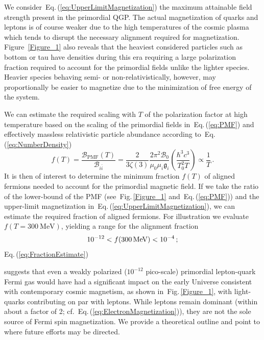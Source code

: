 \documentclass[epjST]{svjour}
\newcommand*{\MeV}{\text{\,MeV}}
\newcommand{\req}[1]{Eq.\,(\ref{#1})}
\newcommand{\rf}[1]{Fig.\,{\ref{#1}}}
\begin{document}
{\color{blue}We consider~\req{eq:UpperLimitMagnetization} the maximum attainable field strength present in the primordial QGP. The actual magnetization of quarks and leptons is of course weaker due to the high temperatures of the cosmic plasma which tends to disrupt the necessary alignment required for magnetization. Figure~\ref{Figure_1} also reveals that the heaviest considered particles such as bottom or tau have densities during this era requiring a large polarization fraction required to account for the primordial fields unlike the lighter species. Heavier species behaving semi- or non-relativistically, however, may proportionally be easier to magnetize due to the minimization of free energy of the system.

We can estimate the required scaling with $T$ of the polarization factor at high temperature based on the scaling of the primordial fields in~\req{eq:PMF} and effectively massless relativistic particle abundance according to~\req{eq:NumberDensity}
\begin{equation}
\label{eq:FractionAligned}
f(T) = \frac{\mathcal{B}_\mathrm{PMF}(T)}{\mathcal{B}_{i\bar{i}}} 
= \frac{2}{3\zeta(3)}\frac{2\pi^{2}\mathcal{B}_{0}}{\mu_{0}\mu_{i}\mathfrak{g}_{i}}\left(\frac{\hbar^{3}c^{3}}{T_{0}^{2}T}\right)\propto\frac{1}{T}\,.
\end{equation}
It is then of interest to determine the minimum fraction \(f(T)\) of aligned fermions needed to account for the primordial magnetic field. If we take the ratio of the lower-bound of the PMF (see~\rf{Figure_1} and~\req{eq:PMF}) and the upper-limit magnetization in~\req{eq:UpperLimitMagnetization}, we can estimate the required fraction of aligned fermions. For illustration we evaluate \(f(T=300~\mathrm{MeV})\), yielding a range for the alignment fraction
\begin{equation}
\label{eq:FractionEstimate}
10^{-12} < f(300\MeV) < 10^{-4}\,;
\end{equation}
\req{eq:FractionEstimate}} suggests that even a weakly polarized ({\color{blue}\(10^{-12}\)} pico-scale) primordial lepton-quark Fermi gas would have had a significant impact on the early Universe consistent with contemporary cosmic magnetism, as shown in~\rf{Figure_1}, with light-quarks contributing on par with leptons. While leptons remain dominant (within about a factor of 2; cf.~\req{eq:ElectronMagnetization}), they are not the sole source of Fermi spin magnetization. We provide a theoretical outline and point to where future efforts may be directed.
\end{document}
